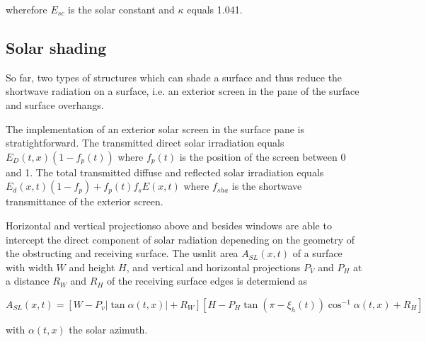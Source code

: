 wherefore $E_{sc}$ is the solar constant and $\kappa$ equals 1.041.

\subsection{Solar shading}

So far, two types of structures which can shade a surface and thus reduce the shortwave radiation on a surface, i.e. an exterior screen in the pane of the surface and surface overhangs.

The implementation of an exterior solar screen in the surface pane is stratightforward. The transmitted direct solar irradiation equals $E_{D}(t,x) \left(1 - f_{p}(t)\right)$ where $f_{p}(t)$ is the position of the screen between 0 and 1. The total transmitted diffuse and reflected solar irradiation equals $E_{d}(x,t) \left(1 - f_{p}\right) +f_{p}(t)  f_{s} E(x,t)$ where $f_{sha}$ is the shortwave transmittance of the exterior screen.

Horizontal and vertical projectionso above and besides windows are able to intercept the direct component of solar radiation depeneding on the geometry of the obstructing and receiving surface. The usnlit area $A_{SL}(x,t)$ of a surface with width $W$ and height $H$, and vertical and horizontal projections $P_{V}$ and $P_{H}$ at a distance $R_{W}$ and $R_{H}$ of the receiving surface edges is determiend as

\begin{dmath}
A_{SL}(x,t) = \left[W - P_{v}  \left|\tan \alpha(t,x) \right| + R_{W}\right] \left[H - P_{H} \tan \left(\pi - \xi_{h}(t)\right) \cos^{-1} \alpha(t,x) + R_{H}\right]
\end{dmath}

with $\alpha(t,x)$ the solar azimuth.












